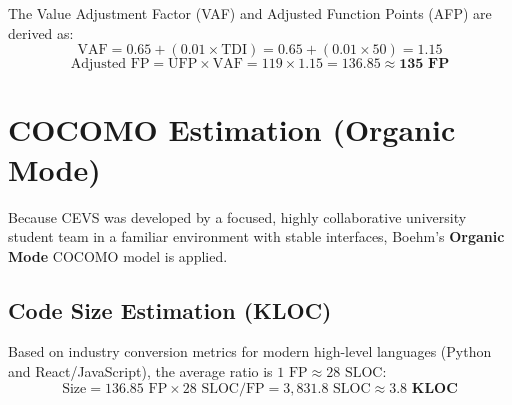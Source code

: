 \documentclass[12pt,a4paper,oneside]{report}
\begin{document}
The Value Adjustment Factor (VAF) and Adjusted Function Points (AFP) are derived as:
\begin{equation}
    \text{VAF} = 0.65 + (0.01 \times \text{TDI}) = 0.65 + (0.01 \times 50) = \mathbf{1.15}
\end{equation}
\begin{equation}
    \text{Adjusted FP} = \text{UFP} \times \text{VAF} = 119 \times 1.15 = \mathbf{136.85 \approx 135 \text{ FP}}
\end{equation}

\section{COCOMO Estimation (Organic Mode)}
Because CEVS was developed by a focused, highly collaborative university student team in a familiar environment with stable interfaces, Boehm's \textbf{Organic Mode} COCOMO model is applied.

\subsection{Code Size Estimation (KLOC)}
Based on industry conversion metrics for modern high-level languages (Python and React/JavaScript), the average ratio is $1\text{ FP} \approx 28\text{ SLOC}$:
\begin{equation}
    \text{Size} = 136.85\text{ FP} \times 28\text{ SLOC/FP} = 3,831.8\text{ SLOC} \approx \mathbf{3.8\text{ KLOC}}
\end{equation}
\end{document}
